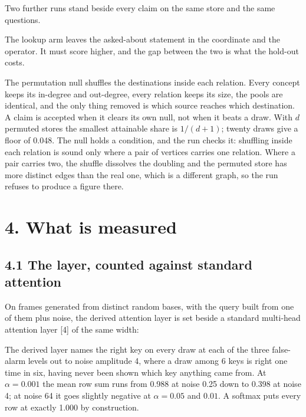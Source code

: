 \documentclass[10pt,letterpaper,twocolumn]{article}
\begin{document}
Two further runs stand beside every claim on the same store and the same questions.

The lookup arm leaves the asked-about statement in the coordinate and the operator. It must score
higher, and the gap between the two is what the hold-out costs.

The permutation null shuffles the destinations inside each relation. Every concept keeps its
in-degree and out-degree, every relation keeps its size, the pools are identical, and the only thing
removed is which source reaches which destination. A claim is accepted when it clears its own null,
not when it beats a draw. With \(d\) permuted stores the smallest attainable share is \(1/(d+1)\); twenty
draws give a floor of 0.048. The null holds a condition, and the run checks it: shuffling inside each
relation is sound only where a pair of vertices carries one relation. Where a pair carries two, the
shuffle dissolves the doubling and the permuted store has more distinct edges than the real one,
which is a different graph, so the run refuses to produce a figure there.

\section{4. What is measured}\label{4-what-is-measured}

\subsection{4.1 The layer, counted against standard attention}\label{41-the-layer-counted-against-standard-attention}

On frames generated from distinct random bases, with the query built from one of them plus noise,
the derived attention layer is set beside a standard multi-head attention layer {[}4{]} of the same
width:


The derived layer names the right key on every draw at each of the three false-alarm levels out to
noise amplitude 4, where a draw among 6 keys is right one time in six, having never been shown which key anything came
from. At \(\alpha = 0.001\) the mean row sum runs from 0.988 at noise 0.25 down to 0.398 at noise 4; at
noise 64 it goes slightly negative at \(\alpha = 0.05\) and \(0.01\). A softmax puts every row at exactly
1.000 by construction.
\end{document}
